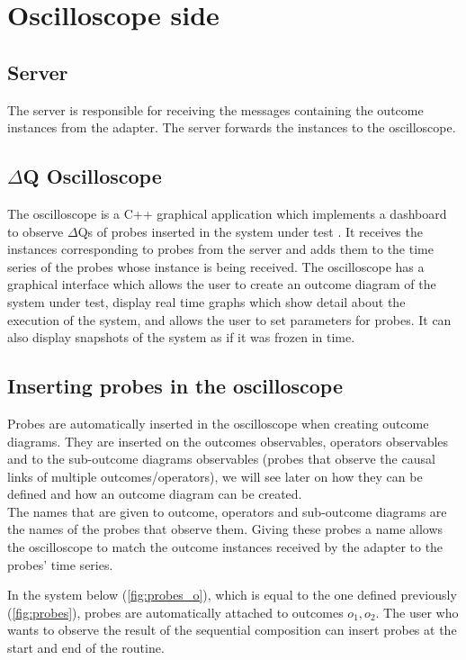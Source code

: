 \section{Oscilloscope side}
    \subsection{Server} The server is responsible for receiving the messages containing the outcome instances from the adapter. The server forwards the instances to the oscilloscope.
    
    \subsection{$\Delta$Q Oscilloscope} The oscilloscope is a C++ graphical application which implements a dashboard to observe $\Delta$Qs of probes inserted in the system under test \cite{osc-g}. It receives the instances corresponding to probes from the server and adds them to the time series of the probes whose instance is being received. 
    The oscilloscope has a graphical interface which allows the user to create an outcome diagram of the system under test, display real time graphs which show detail about the execution of the system, and allows the user to set parameters for probes. It can also display snapshots of the system as if it was frozen in time.

    \subsection{Inserting probes in the oscilloscope}
        Probes are automatically inserted in the oscilloscope when creating outcome diagrams. They are inserted on the outcomes observables, operators observables and to the sub-outcome diagrams observables (probes that observe the causal links of multiple outcomes/operators), we will see later on how they can be defined and how an outcome diagram can be created. \\
    The names that are given to outcome, operators and sub-outcome diagrams are the names of the probes that observe them. Giving these probes a name allows the oscilloscope to match the outcome instances received by the adapter to the probes' time series.

        In the system below (\cref{fig:probes_o}), which is equal to the one defined previously (\cref{fig:probes}), probes are automatically attached to outcomes $o_1, o_2$. The user who wants to observe the result of the sequential composition can insert probes at the start and end of the routine. 
    
